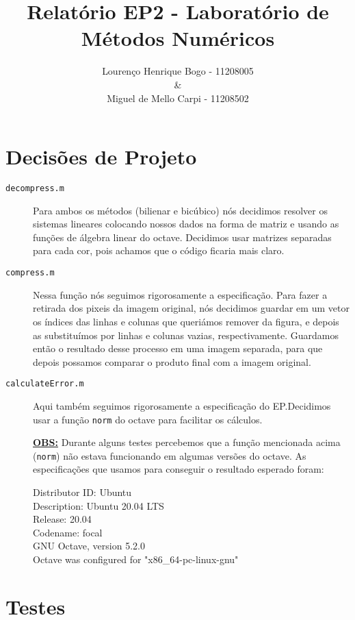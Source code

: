 \documentclass[12pt]{article}
\title{Relatório EP2 - Laboratório de Métodos Numéricos}
\author{Lourenço Henrique Bogo - 11208005 \\ \& \\Miguel de Mello Carpi - 11208502}
\date{}
\newcommand{\mytitle}[1]{\textbf{\underline{#1}}}
\begin{document}
\maketitle

\section{Decisões de Projeto}

\begin{description}
  
\item[\texttt{decompress.m}] Para ambos os métodos (bilienar e bicúbico) nós decidimos resolver os sistemas lineares colocando nossos dados na forma de matriz e usando as funções de álgebra linear do octave. Decidimos usar matrizes separadas para cada cor, pois achamos que o código ficaria mais claro.
  
\item[\texttt{compress.m}] Nessa função nós seguimos rigorosamente a especificação. Para fazer a retirada dos pixeis da imagem original, nós decidimos guardar em um vetor os índices das linhas e colunas que queriámos remover da figura, e depois as substituímos por linhas e colunas vazias, respectivamente. Guardamos então o resultado desse processo em uma imagem separada, para que depois possamos comparar o produto final com a imagem original.
  
\item[\texttt{calculateError.m}] Aqui também seguimos rigorosamente a especificação do EP.\@ Decidimos usar a função \texttt{norm} do octave para facilitar os cálculos.

  \mytitle{OBS:} Durante alguns testes percebemos que a função mencionada acima (\texttt{norm}) não estava funcionando em algumas versões do octave.
  As especificações que usamos para conseguir o resultado esperado foram:

  Distributor ID:  Ubuntu\\
  Description:  Ubuntu 20.04 LTS\\
  Release:  20.04\\
  Codename:  focal\\

  GNU Octave, version 5.2.0\\
  Octave was configured for "x86\_64-pc-linux-gnu"\\
  
\end{description}

\section{Testes}
\end{document}
